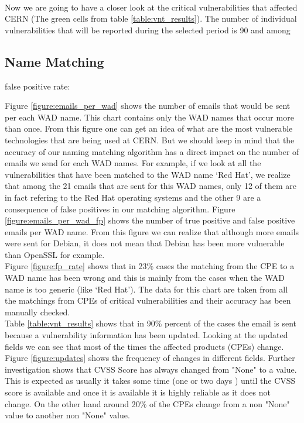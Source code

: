{{\paragraph{}
Now we are going to have a closer look at the critical vulnerabilities that affected CERN (The green cells from table \ref{table:vnt_results}). The number of individual vulnerabilities that will be reported during the selected period is 90 and among

\subsection{Name Matching }
false positive rate:

Figure \ref{figure:emails_per_wad} shows the number of emails that would be sent per each WAD name. This chart contains only the WAD names that occur more than once. From this figure one can get an idea of what are the most vulnerable technologies that are being used at CERN. But we should keep in mind that the accuracy of our naming matching algorithm has a direct impact on the number of emails we send for each WAD names. For example, if we look at all the vulnerabilities that have been matched to the WAD name `Red Hat', we realize that among the 21 emails that are sent for this WAD names, only 12 of them are in fact refering to the Red Hat operating systems and the  other 9 are a consequence of false positives in our matching algorithm. Figure \ref{figure:emails_per_wad_fp} shows the number of true positive and false positive emails per WAD name. From this figure we can realize that although more emails were sent for Debian, it does not mean that Debian has been more vulnerable than OpenSSL for example.
\\
Figure \ref{figure:fp_rate} shows that in 23\% cases the matching from the CPE to a WAD name has been wrong and this is mainly from the cases when the WAD name is too generic (like `Red Hat'). The data for this chart are taken from all the matchings from CPEs of critical vulnerabilities and their accuracy has been manually checked. 
\\
Table \ref{table:vnt_results} shows that in 90\% percent of the cases the email is sent because a vulnerability information has been updated. Looking at the updated fields we can see that most of the times the affected products (CPEs) change. Figure \ref{figure:updates} shows the frequency of changes in different fields. Further investigation shows that CVSS Score has always changed from "None" to a value. This is expected as usually it takes some time (one or two days	) until the CVSS score is available and once it is available it is highly reliable as it does not change. On the other hand around 20\% of the CPEs change from a non "None" value to another non "None" value.









}}
